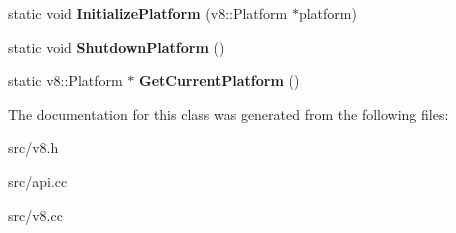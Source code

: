 \begin{DoxyCompactItemize}
\item 
\hypertarget{classv8_1_1internal_1_1_v8_a5f5a64c4edc23f8a5674a05038417260}{}static void {\bfseries Initialize\+Platform} (v8\+::\+Platform $\ast$platform)\label{classv8_1_1internal_1_1_v8_a5f5a64c4edc23f8a5674a05038417260}

\item 
\hypertarget{classv8_1_1internal_1_1_v8_a04db7c30414303a26aa5b7949428b8ff}{}static void {\bfseries Shutdown\+Platform} ()\label{classv8_1_1internal_1_1_v8_a04db7c30414303a26aa5b7949428b8ff}

\item 
\hypertarget{classv8_1_1internal_1_1_v8_a5eb1d47c492fa1e85e7d7c31dd5cf2bb}{}static v8\+::\+Platform $\ast$ {\bfseries Get\+Current\+Platform} ()\label{classv8_1_1internal_1_1_v8_a5eb1d47c492fa1e85e7d7c31dd5cf2bb}

\end{DoxyCompactItemize}


The documentation for this class was generated from the following files\+:\begin{DoxyCompactItemize}
\item 
src/v8.\+h\item 
src/api.\+cc\item 
src/v8.\+cc\end{DoxyCompactItemize}
